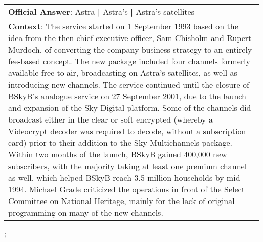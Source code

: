 \begin{figure*}[ht]
{\begin{tabular}{p{}}
            \textbf{Official Answer}: Astra \textbf{|} Astra's \textbf{|} Astra's satellites                                                                                                                                                                                                                                                                                                                                                                                                                                                                                                                                                                                                                                                                                                                                                                                                                                                                                                                                                                                                                                                          \\
            \textbf{Context}: The service started on 1 September 1993 based on the idea from the then chief executive officer, Sam Chisholm and Rupert Murdoch, of converting the company business strategy to an entirely fee-based concept. The new package included four channels formerly available free-to-air, broadcasting on Astra's satellites, as well as introducing new channels. The service continued until the closure of BSkyB's analogue service on 27 September 2001, due to the launch and expansion of the Sky Digital platform. Some of the channels did broadcast either in the clear or soft encrypted (whereby a Videocrypt decoder was required to decode, without a subscription card) prior to their addition to the Sky Multichannels package. Within two months of the launch, BSkyB gained 400,000 new subscribers, with the majority taking at least one premium channel as well, which helped BSkyB reach 3.5 million households by mid-1994. Michael Grade criticized the operations in front of the Select Committee on National Heritage, mainly for the lack of original programming on many of the new channels. \\
        \end{tabular}
    };
    \label{fig:ex-570961aa200fba1400367f16}
\end{figure*}

